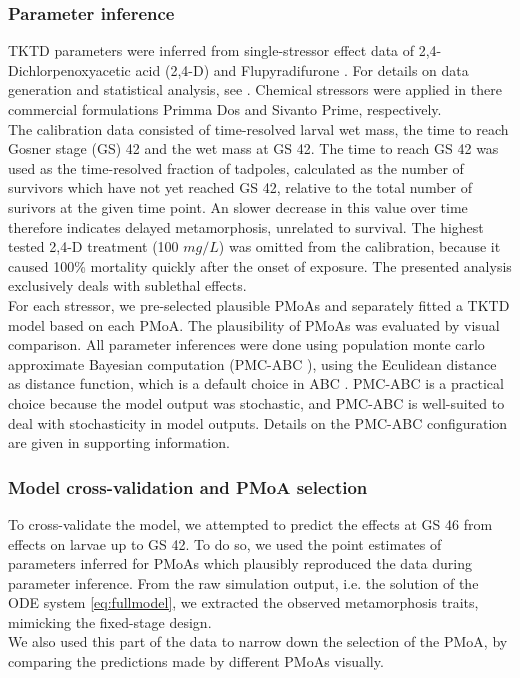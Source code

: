 \documentclass[utf8]{FrontiersinHarvard} %
\begin{document}
\subsubsection{Parameter inference}
%
TKTD parameters were inferred from single-stressor effect data of 2,4-Dichlorpenoxyacetic acid (2,4-D) and Flupyradifurone \citep{gonzalez-lopezChronicExposurePesticides2026}.
For details on data generation and statistical analysis, see \citet{gonzalez-lopezChronicExposurePesticides2026}. 
Chemical stressors were applied in there commercial formulations Primma \textregistered Dos and Sivanto \textregistered Prime, respectively.  \\ 
The calibration data consisted of time-resolved larval wet mass, 
the time to reach Gosner stage (GS) 42 and the wet mass at GS 42. 
The time to reach GS 42 was used as the time-resolved fraction 
of tadpoles, calculated as the number of survivors which have not yet reached GS 42, 
relative to the total number of surivors at the given time point.
An slower decrease in this value over time therefore indicates delayed metamorphosis, 
unrelated to survival.  
The highest tested 2,4-D treatment (100 $mg/L$) was omitted from the calibration, 
because it caused 100\% mortality quickly after the onset of exposure. 
The presented analysis exclusively deals with sublethal effects.\\
% 
For each stressor, we pre-selected plausible PMoAs and separately fitted a TKTD model based on each PMoA. 
The plausibility of PMoAs was evaluated by visual comparison.
%
All parameter inferences were done using population monte carlo approximate Bayesian computation 
(PMC-ABC \citep{beaumontAdaptiveApproximateBayesian2009}), 
using the Eculidean distance as distance function, which is a default choice in ABC \citep{prangleAdaptingABCDistance2017}. 
PMC-ABC is a practical choice because the model output was stochastic, 
and PMC-ABC is well-suited to deal with stochasticity in model outputs. 
Details on the PMC-ABC configuration are given in supporting information.\\
%
\subsubsection{Model cross-validation and PMoA selection}
%
To cross-validate the model, we attempted to predict the effects at GS 46 from effects on larvae up to GS 42. 
To do so, we used the point estimates of parameters inferred for PMoAs which plausibly reproduced the data during parameter inference. 
From the raw simulation output, i.e. the solution of the ODE system \ref{eq:fullmodel}, 
we extracted the observed metamorphosis traits, mimicking the fixed-stage design. \\ 
We also used this part of the data to narrow down the selection of the PMoA, 
by comparing the predictions made by different PMoAs visually. 
\end{document}
